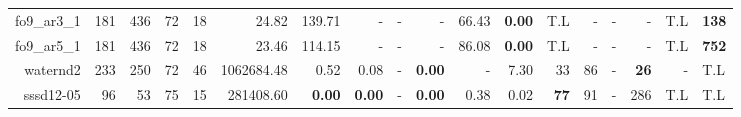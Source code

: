 \begin{table*}[t]
\begin{tabular}{|r|r|r|r|r||r||r|r|r|r|r||r|r|r|r|r|r|}
                       fo9\_ar3\_1 &          181 &           436 &           72 &            18 &               24.82 &         139.71 &              - &             - &              - &         66.43 & \textbf{0.00} &                T.L &                  - &                  - &                  - &          T.L & \textbf{138} \\ 
                       fo9\_ar5\_1 &          181 &           436 &           72 &            18 &               23.46 &         114.15 &              - &             - &              - &         86.08 & \textbf{0.00} &                T.L &                  - &                  - &                  - &          T.L & \textbf{752} \\ 
                          waternd2 &          233 &           250 &           72 &            46 &          1062684.48 &           0.52 &           0.08 &             - &  \textbf{0.00} &             - &          7.30 &                 33 &                 86 &                  - &        \textbf{26} &            - &          T.L \\ 
                         sssd12-05 &           96 &            53 &           75 &            15 &           281408.60 &  \textbf{0.00} &  \textbf{0.00} &             - &  \textbf{0.00} &          0.38 &          0.02 &        \textbf{77} &                 91 &                  - &                286 &          T.L &          T.L \\ 
\hline 
\end{tabular}\\ 
\label{table:results} 
\end{table*} 
 
